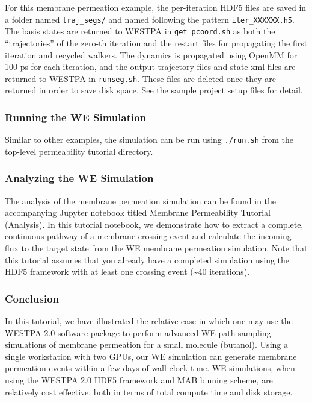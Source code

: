 For this membrane permeation example, the per-iteration HDF5 files are saved in a folder named \verb|traj_segs/| and named following the pattern \verb|iter_XXXXXX.h5|. 
The basis states are returned to WESTPA in \verb|get_pcoord.sh| as both the “trajectories” of the zero-th iteration and the restart files for propagating the first iteration and recycled walkers. 
The dynamics is propagated using OpenMM for 100 ps for each iteration, and the output trajectory files and state xml files are returned to WESTPA in \verb|runseg.sh|. 
These files are deleted once they are returned in order to save disk space. 
See the sample project setup files for detail.

\subsubsection{Running the WE Simulation}
Similar to other examples, the simulation can be run using \verb|./run.sh| from the top-level permeability tutorial directory.

\subsubsection{Analyzing the WE Simulation}
The analysis of the membrane permeation simulation can be found in the accompanying Jupyter notebook titled Membrane Permeability Tutorial (Analysis). 
In this tutorial notebook, we demonstrate how to extract a complete, continuous pathway of a membrane-crossing event and calculate the incoming flux to the target state from the WE membrane permeation simulation. 
Note that this tutorial assumes that you already have a completed simulation using the HDF5 framework with at least one crossing event (\textasciitilde40 iterations).

\subsubsection{Conclusion}
In this tutorial, we have illustrated the relative ease in which one may use the WESTPA 2.0 software package to perform advanced WE path sampling simulations of membrane permeation for a small molecule (butanol). 
Using a single workstation with two GPUs, our WE simulation can generate membrane permeation events within a few days of wall-clock time. 
WE simulations, when using the WESTPA 2.0 HDF5 framework and MAB binning scheme, are relatively cost effective, both in terms of total compute time and disk storage.
